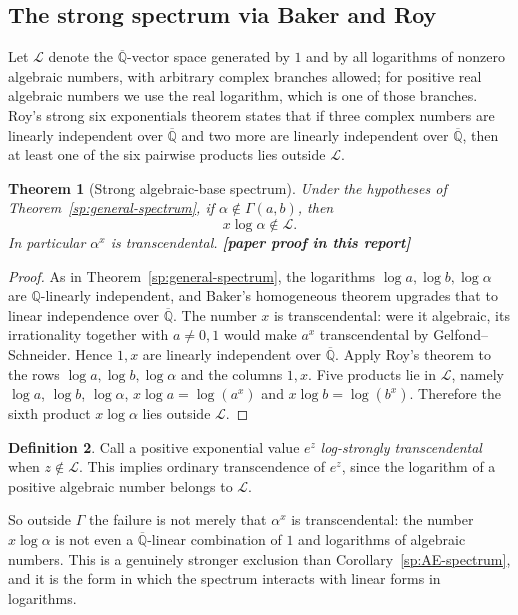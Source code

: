\documentclass[11pt,oneside]{article}
\newtheorem{theorem}{Theorem}[section]
\theoremstyle{definition}
\newtheorem{definition}[theorem]{Definition}
\theoremstyle{remark}
\newcommand{\Q}{\mathbb Q}
\newcommand{\Abar}{\overline{\mathbb Q}}
\newcommand{\LL}{\mathcal L}
\newcommand{\GammaSat}{\Gamma}
\newcommand{\Qbar}{\Abar}
\newcommand{\statusnew}{\textcolor{newgreen}{\textbf{[paper proof in this report]}}}
\begin{document}
\subsection{The strong spectrum via Baker and Roy}

Let $\LL$ denote the $\Qbar$-vector space generated by $1$ and by all logarithms of nonzero
algebraic numbers, with arbitrary complex branches allowed; for positive real algebraic
numbers we use the real logarithm, which is one of those branches.  Roy's strong six
exponentials theorem \cite{Roy1992,Waldschmidt2005} states that if three complex numbers are
linearly independent over $\Qbar$ and two more are linearly independent over $\Qbar$, then at
least one of the six pairwise products lies outside $\LL$.

\begin{theorem}[Strong algebraic-base spectrum]\label{sp:strong-spectrum}
Under the hypotheses of Theorem~\ref{sp:general-spectrum}, if
$\alpha\notin\GammaSat(a,b)$, then
\[
  x\log\alpha\notin\LL.
\]
In particular $\alpha^{x}$ is transcendental.  \statusnew
\end{theorem}

\begin{proof}
As in Theorem~\ref{sp:general-spectrum}, the logarithms $\log a,\log b,\log\alpha$ are
$\Q$-linearly independent, and Baker's homogeneous theorem \cite{Baker1975} upgrades that to
linear independence over $\Qbar$.  The number $x$ is transcendental: were it algebraic, its
irrationality together with $a\ne0,1$ would make $a^{x}$ transcendental by
Gelfond--Schneider.  Hence $1,x$ are linearly independent over $\Qbar$.  Apply Roy's theorem
to the rows $\log a,\log b,\log\alpha$ and the columns $1,x$.  Five products lie in $\LL$,
namely $\log a$, $\log b$, $\log\alpha$, $x\log a=\log(a^{x})$ and $x\log b=\log(b^{x})$.
Therefore the sixth product $x\log\alpha$ lies outside $\LL$.
\end{proof}

\begin{definition}\label{sp:log-strong}
Call a positive exponential value $e^{z}$ \emph{log-strongly transcendental} when
$z\notin\LL$.  This implies ordinary transcendence of $e^{z}$, since the logarithm of a
positive algebraic number belongs to $\LL$.
\end{definition}

So outside $\GammaSat$ the failure is not merely that $\alpha^{x}$ is transcendental: the
number $x\log\alpha$ is not even a $\Qbar$-linear combination of $1$ and logarithms of
algebraic numbers.  This is a genuinely stronger exclusion than
Corollary~\ref{sp:AE-spectrum}, and it is the form in which the spectrum interacts with
linear forms in logarithms.
\end{document}
